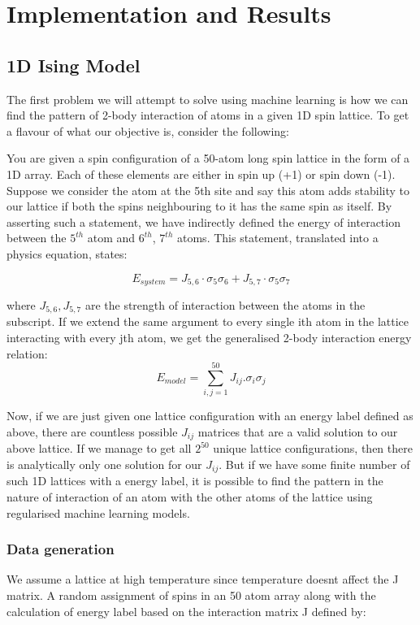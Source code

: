 \section{Implementation and Results}

\subsection{1D Ising Model}

The first problem we will attempt to solve using machine learning is how we can find the pattern of 2-body interaction of atoms in a given 1D spin lattice.
To get a flavour of what our objective is, consider the following:

You are given a spin configuration of a 50-atom long spin lattice in the form of a 1D array.
Each of these elements are either in spin up (+1) or spin down (-1).
Suppose we consider the atom at the 5th site and say this atom adds stability to our lattice if both the spins neighbouring to it has the same spin as itself.
By asserting such a statement, we have indirectly defined the energy of interaction between the $5^{th}$ atom and $6^{th}$, $7^{th}$ atoms.
This statement, translated into a physics equation, states:

\[ E_{system}=J_{5,6} \cdot \sigma_5\sigma_6 + J_{5,7} \cdot \sigma_5\sigma_7\]

where \(J_{5,6}, J_{5,7}\) are the strength of interaction between the atoms in the subscript.
If we extend the same argument to every single ith atom in the lattice interacting with every jth atom, we get the generalised 2-body interaction energy relation: \[E_{model}=\sum_{i,j=1}^{50}J_{ij}.\sigma_i\sigma_j\]

Now, if we are just given one lattice configuration with an energy label defined as above, there are countless possible \(J_{ij}\) matrices that are a valid solution to our above lattice.
If we manage to get all \(2^{50}\) unique lattice configurations, then there is analytically only one solution for our \(J_{ij}\).
But if we have some finite number of such 1D lattices with a energy label, it is possible to find the pattern in the nature of interaction of an atom with the other atoms of the lattice using regularised machine learning models.

\subsubsection{Data generation}

We assume a lattice at high temperature since temperature doesnt affect the J matrix.
A random assignment of spins in an 50 atom array along with the calculation of energy label based on the interaction matrix J defined by:

